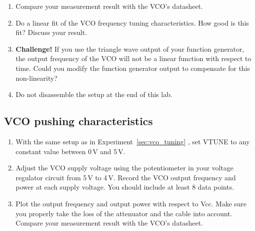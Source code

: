 \documentclass[letterpaper, 11pt]{article}
\begin{document}
\begin{enumerate}
	\item Compare your measurement result with the VCO's datasheet. 

	\item Do a linear fit of the VCO frequency tuning characteristics. How good is this fit? Discuss your result.
	
	\item \textbf{Challenge!} If you use the triangle wave output of your function generator, the output frequency of the VCO will not be a linear function with respect to time. Could you modify the function generator output to compensate for this non-linearity? 

	\item Do not disassemble the setup at the end of this lab. 

\end{enumerate}

\subsection{VCO pushing characteristics}

\begin{enumerate}
	\item With the same setup as in Experiment~\ref{sec:vco_tuning} , set VTUNE to any constant value between 0\,V and 5\,V.
	
	\item Adjust the VCO supply voltage using the potentiometer in your voltage regulator circuit from 5\,V to 4\,V. Record the VCO output frequency and power at each supply voltage. You should include at least 8 data points.
	
	\item Plot the output frequency and output power with respect to Vcc. Make sure you properly take the loss of the attenuator and the cable into account. 
	Compare your measurement result with the VCO's datasheet.
	
\end{enumerate}


%
% 
%
%
%
\end{document}

